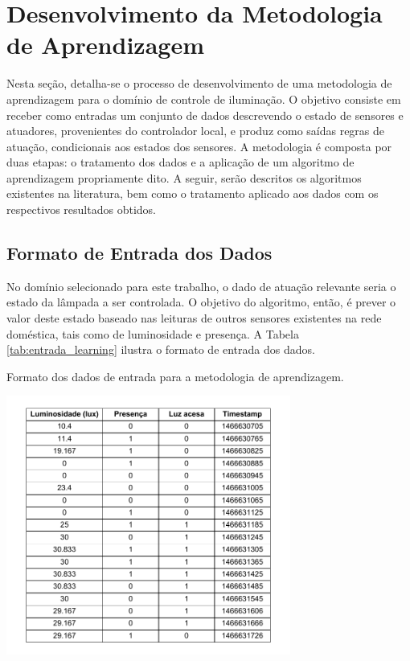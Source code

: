 \section{Desenvolvimento da Metodologia de Aprendizagem}
Nesta seção, detalha-se o processo de desenvolvimento de uma metodologia de aprendizagem para o domínio de controle de iluminação. O objetivo consiste em receber como entradas um conjunto de dados descrevendo o estado de sensores e atuadores, provenientes do controlador local, e produz como saídas regras de atuação, condicionais aos estados dos sensores. A metodologia é composta por duas etapas: o tratamento dos dados e a aplicação de um algoritmo de aprendizagem propriamente dito. A seguir, serão descritos os algoritmos existentes na literatura, bem como o tratamento aplicado aos dados com os respectivos resultados obtidos.

\subsection{Formato de Entrada dos Dados}\label{subsec:formatoentrada}
No domínio selecionado para este trabalho, o dado de atuação relevante seria o estado da lâmpada a ser controlada. O objetivo do algoritmo, então, é prever o valor deste estado baseado nas leituras de outros sensores existentes na rede doméstica, tais como de luminosidade e presença. A Tabela \ref{tab:entrada_learning} ilustra o formato de entrada dos dados.

\begin{table}[h]
	\centering
	\caption{Formato dos dados de entrada para a metodologia de aprendizagem.}\smallskip
	\label{tab:entrada_learning}
	\includegraphics[width=0.7\textwidth]{tabelas/raw_table.pdf}
\end{table}

